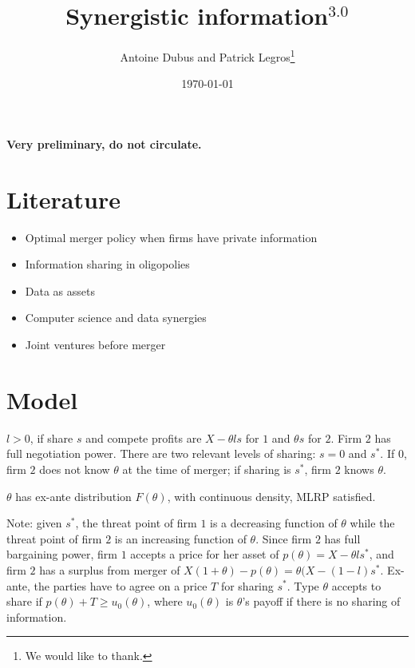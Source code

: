 \documentclass[a4paper]{article}
\renewcommand{\t}{\theta}
\begin{document}
\title{Synergistic information$^{3.0}$}
\author{Antoine Dubus and Patrick Legros\thanks{We would like to thank.}}
\date{\today}


\maketitle

\begin{abstract}

\noindent 

\end{abstract}
 
\textbf{Very preliminary, do not circulate.}

\baselineskip0.7cm

\section{Literature}
\begin{itemize}\setlength\itemsep{-1em}
    \item Optimal merger policy when firms have private information \cite{Besanko1993}
    \item Information sharing in oligopolies
    \item Data as assets
    \item Computer science and data synergies
    \item Joint ventures before merger
\end{itemize}

\section{Model}






$l>0$, if share $s$ and compete profits are $X-\t l s$ for $1$ and $\t s$ for $2$. Firm $2$ has full negotiation power. There are two relevant levels of sharing: $s=0$ and $s^*$. If $0$, firm $2$ does not know $\t$ at the time of merger; if sharing is $s^*$, firm $2$ knows $\t$.

$\t$ has ex-ante distribution $F(\t)$, with continuous density, MLRP satisfied.

Note: given $s^*$, the threat point of firm $1$ is a decreasing function of $\t$ while the threat point of firm $2$ is an increasing function of $\t$. Since firm $2$ has full bargaining power, firm $1$ accepts a price for her asset of $p(\t)=X-\t l s^*$, and firm $2$ has a surplus from merger of $X(1+\t)-p(\t)=\t (X-(1-l)s^*$. Ex-ante, the parties have to agree on a price $T$ for sharing $s^*$. Type $\t$ accepts to share if $p(\t)+T\geq u_0(\t)$, where $u_0(\t)$ is $\t$'s payoff if there is no sharing of information.
\end{document}
